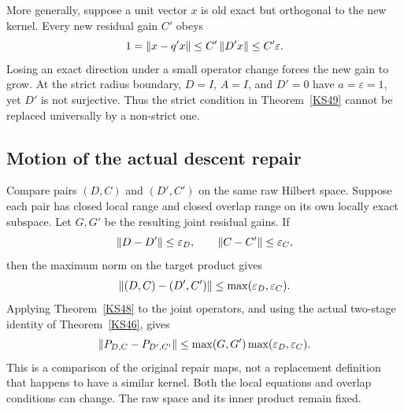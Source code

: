 More generally, suppose a unit vector \(x\) is old exact but orthogonal to the new kernel. Every new residual gain \(C'\) obeys
\[
 1=\left\lVert x-q'x\right\rVert\le C'\left\lVert D'x\right\rVert\le C'\varepsilon.
\]
Losing an exact direction under a small operator change forces the new gain to grow. At the strict radius boundary, \(D=I\), \(A=I\), and \(D'=0\) have \(a=\varepsilon=1\), yet \(D'\) is not surjective. Thus the strict condition in Theorem~\ref{KS49} cannot be replaced universally by a non-strict one.

\subsection{Motion of the actual descent repair}
Compare pairs \((D,C)\) and \((D',C')\) on the same raw Hilbert space. Suppose each pair has closed local range and closed overlap range on its own locally exact subspace. Let \(G,G'\) be the resulting joint residual gains. If
\[
 \left\lVert D-D'\right\rVert\le\varepsilon_D,\qquad
 \left\lVert C-C'\right\rVert\le\varepsilon_C,
\]
then the maximum norm on the target product gives
\[
 \left\lVert(D,C)-(D',C')\right\rVert\le\max(\varepsilon_D,\varepsilon_C).
\]
Applying Theorem~\ref{KS48} to the joint operators, and using the actual two-stage identity of Theorem~\ref{KS46}, gives
\begin{equation}\label{eq:descentmotion}
 \left\lVert P_{D,C}-P_{D',C'}\right\rVert
 \le\max(G,G')\max(\varepsilon_D,\varepsilon_C).
\end{equation}
This is a comparison of the original repair maps, not a replacement definition that happens to have a similar kernel. Both the local equations and overlap conditions can change. The raw space and its inner product remain fixed.
